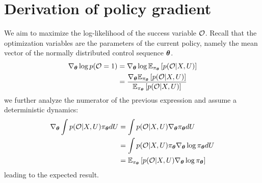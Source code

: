 \section{Derivation of policy gradient}
We aim to maximize the log-likelihood of the success variable $\mathcal{O}$. Recall that the optimization variables are the parameters of the current policy, namely the mean vector of the normally distributed control sequence $\boldsymbol{\theta}$. 
\begin{align*}
    \nabla_{\boldsymbol{\theta}} \log p(\mathcal{O} = 1) &= \nabla_{\boldsymbol{\theta}} \log \mathbb{E}_{\pi_{\boldsymbol{\theta}}} \left [p(\mathcal{O} | X, U)\right] \\
    &= \frac{\nabla_{\boldsymbol{\theta}} \mathbb{E}_{\pi_{\boldsymbol{\theta}}} \left [p(\mathcal{O} | X, U)\right]}{\mathbb{E}_{\pi_{\boldsymbol{\theta}}} \left [p(\mathcal{O} | X, U)\right]}
\end{align*}
we further analyze the numerator of the previous expression and assume a deterministic dynamics:
\begin{align*}
    \nabla_{\boldsymbol{\theta}} \int p(\mathcal{O} | X, U) \pi_{\boldsymbol{\theta}} dU &= \int p(\mathcal{O} | X, U) \nabla_{\boldsymbol{\theta}} \pi_{\boldsymbol{\theta}} dU \\
    &= \int p(\mathcal{O} | X, U) \pi_{\boldsymbol{\theta}} \nabla_{\boldsymbol{\theta}} \log \pi_{\boldsymbol{\theta}} dU \\
    &= \mathbb{E}_{\pi_{\boldsymbol{\theta}}} \left [p(\mathcal{O} | X, U) \nabla_{\boldsymbol{\theta}} \log \pi_{\boldsymbol{\theta}}\right]
\end{align*}
leading to the expected result. 

